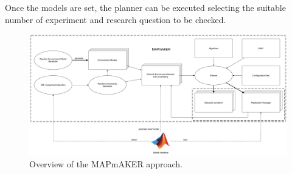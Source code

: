Once the models are set, the planner can be executed selecting the suitable number of experiment and research question to be checked.

\begin{figure}[!t]
\begin{center}
\includegraphics[width=0.9\linewidth]{Figures/MAPmAKER.pdf}
\caption{Overview of the MAPmAKER approach.}
\label{fig:overview}
\end{center}
\end{figure}





